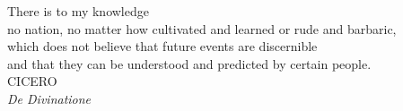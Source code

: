 
\thispagestyle{empty}
\begin{center}
    \vspace*{\fill}
    {\large There is to my knowledge}\\
    {\large no nation, no matter how cultivated and learned or rude and barbaric,}\\
    {\large which does not believe that future events are discernible}\\
    {\large and that they can be understood and predicted by certain people.}\\[2\baselineskip]
    {\scshape CICERO}\\
    \textit{De Divinatione}
    \vspace*{\fill}
\end{center}
\clearpage
